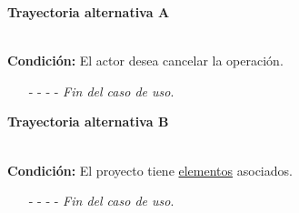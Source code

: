 	\hypertarget{CU2-3:TAA}{\textbf{Trayectoria alternativa A}}\\
	\noindent \textbf{Condición:} El actor desea cancelar la operación.
	\begin{enumerate}
		\UCpaso[\UCactor] Solicita cancelar la operación oprimiendo el botón  de la ventana emergente.
		\UCpaso[\UCsist] Muestra la pantalla .
		\item[- -] - - {\em {Fin del caso de uso}}.%
	\end{enumerate}

	\hypertarget{CU2-3:TAB}{\textbf{Trayectoria alternativa B}}\\
	\noindent \textbf{Condición:} El proyecto tiene \hyperlink{tElemento}{elementos} asociados.
	\begin{enumerate}
		\UCpaso[\UCsist] Muestra la pantalla  con el mensaje .
		\item[- -] - - {\em {Fin del caso de uso}}.%
	\end{enumerate}